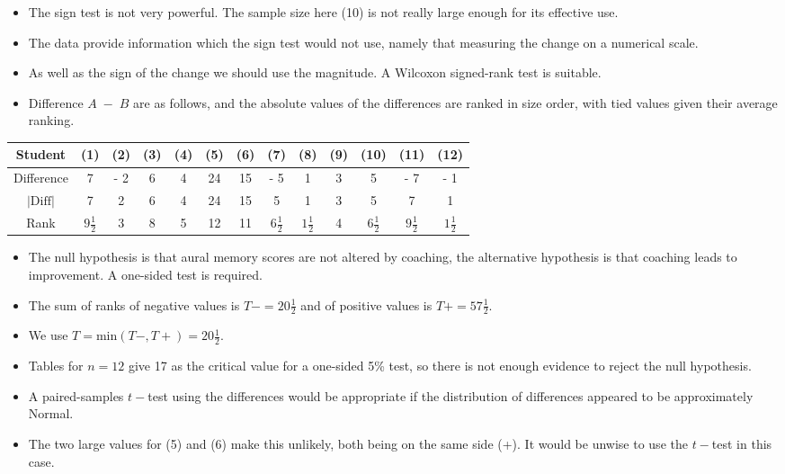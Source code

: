 \documentclass[a4paper,12pt]{article}
\begin{document}
	\newpage
	\begin{itemize}
		\item The sign test is not very powerful. The sample size here (10) is not really large enough for its effective use.
		\item The data provide information which the sign test would not use,
		namely that measuring the change on a numerical scale.
		\item As well as the sign of the change we should use the magnitude. A Wilcoxon signed-rank
		test is suitable. 
		\item Difference $A \;-\; B$ are as follows, and the absolute
		values of the differences are ranked in size order, with tied values
		given their average ranking.
	\end{itemize}
	
	
	\begin{center}
		\begin{tabular}{|c|c|c|c|c|c|c|c|c|c|c|c|c|} \hline 
			Student &(1)& (2) &(3) &(4) &(5) &(6) &(7) &(8)& (9)& (10)& (11)& (12)\\ \hline 
			Difference & 7 & - 2 & 6 & 4 & 24 & 15 & - 5 & 1 & 3 & 5 & - 7& - 1 \\  \hline 
			$|\mbox{Diff}|$ & 7 &  2 & 6 & 4 & 24 & 15 &  5 & 1 & 3 & 5 & 7&  1 \\  \hline 
			Rank &${ \displaystyle  9 \frac{1}{2} }$  & 3 & 8 & 5 & 12 & 11 &${ \displaystyle  6\frac{1}{2} }$  & ${ \displaystyle 1\frac{1}{2} }$  & 4 & ${ \displaystyle 6\frac{1}{2}}$  & ${ \displaystyle 9\frac{1}{2} }$  & ${ \displaystyle 1\frac{1}{2} }$  \\ \hline 
		\end{tabular}
	\end{center}
	\newpage
	\bigskip 
	\begin{itemize}
		\item 
		The null hypothesis is that aural memory scores are not altered by
		coaching, the alternative hypothesis is that coaching leads to
		improvement. A one-sided test is required.
		\item 
		The sum of ranks of negative values is $T-  = 20\frac{1}{2}$ and of positive values
		is $T+ = 57\frac{1}{2} $. 
		\item We use $T = \mbox{min}(T- , T+) = 20\frac{1}{2}$. 
		\item Tables for $n = 12$ give 17
		as the critical value for a one-sided 5\% test, so there is not enough
		evidence to reject the null hypothesis.
		\item A paired-samples $t-$test using the differences would be appropriate if
		the distribution of differences appeared to be approximately Normal.
		\item The two large values for (5) and (6) make this unlikely, both being on
		the same side (+). It would be unwise to use the $t-$test in this case.
	\end{itemize}
	
\end{document}
